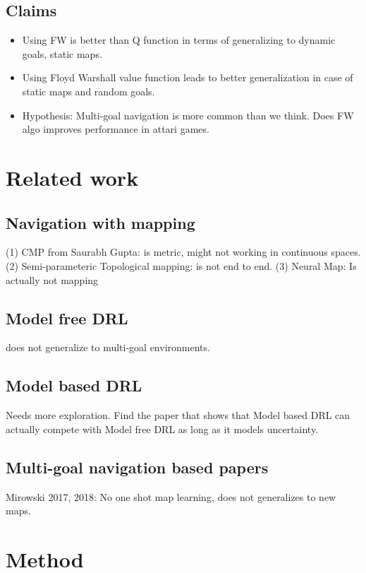 \documentclass[letterpaper]{article} %
\begin{document}
\subsection{Claims}
\begin{itemize} \item
Using FW is better than Q function in terms of generalizing to dynamic goals, static maps.
\item 
Using Floyd Warshall value function leads to better generalization in case of static maps and
random goals.
\item
Hypothesis: Multi-goal navigation is more common than we think. Does FW algo improves performance in attari games.
\end{itemize}

\section{Related work}
\subsection{Navigation with mapping}
 (1) CMP from Saurabh Gupta: is metric, might not working in continuous spaces.
 (2) Semi-parameteric Topological mapping: is not end to end.
 (3) Neural Map: Is actually not mapping

\subsection{Model free DRL }
does not generalize to multi-goal environments.

\subsection{Model based DRL}
Needs more exploration.
Find the paper that shows that Model based DRL can actually compete with Model free DRL as long as it models uncertainty.

\subsection{Multi-goal navigation based papers}
Mirowski 2017, 2018: No one shot map learning, does not generalizes to new maps.


\section{Method}
\end{document}
